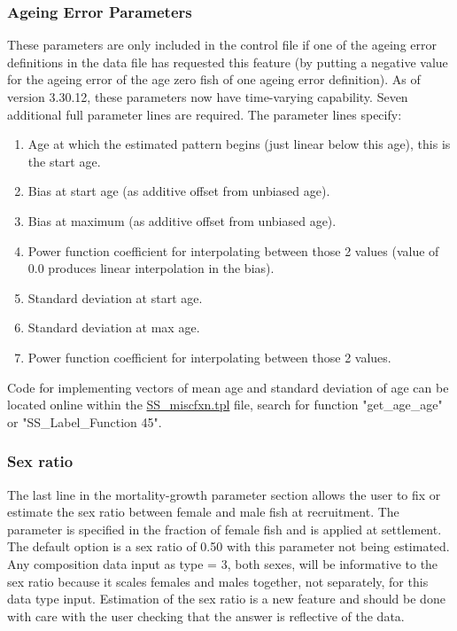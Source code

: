 \subsubsection{Ageing Error Parameters}
These parameters are only included in the control file if one of the ageing error definitions in the data file has requested this feature (by putting a negative value for the ageing error of the age zero fish of one ageing error definition). As of version 3.30.12, these parameters now have time-varying capability. Seven additional full parameter lines are required. The parameter lines specify:
\begin{enumerate}
	\item Age at which the estimated pattern begins (just linear below this age), this is the start age.
	\item Bias at start age (as additive offset from unbiased age).
	\item Bias at maximum (as additive offset from unbiased age).
	\item Power function coefficient for interpolating between those 2 values (value of 0.0 produces linear interpolation in the bias).
	\item Standard deviation at start age.
	\item Standard deviation at max age.
	\item Power function coefficient for interpolating between those 2 values.
\end{enumerate}

\noindent Code for implementing vectors of mean age and standard deviation of age can be located online within the  \href{https://github.com/nmfs-stock-synthesis/stock-synthesis/blob/main/SS_miscfxn.tpl}{SS\_miscfxn.tpl} file, search for function "get\_age\_age" or "SS\_Label\_Function 45".

\subsubsection{Sex ratio}
The last line in the mortality-growth parameter section allows the user to fix or estimate the sex ratio between female and male fish at recruitment.  The parameter is specified in the fraction of female fish and is applied at settlement. The default option is a sex ratio of 0.50 with this parameter not being estimated.  Any composition data input as type = 3, both sexes, will be informative to the sex ratio because it scales females and males together, not separately, for this data type input. Estimation of the sex ratio is a new feature and should be done with care with the user checking that the answer is reflective of the data.


